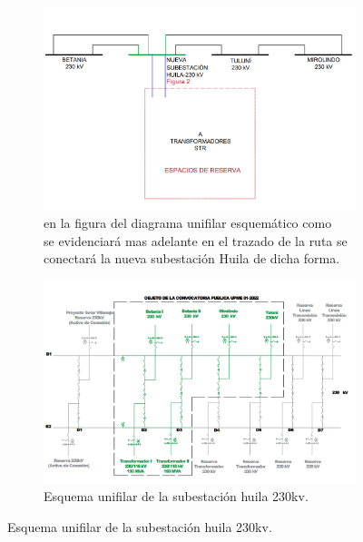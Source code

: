 \begin{figure}[h!] %
    \centering %
    \begin{subfigure}{0.5\textwidth}
        \includegraphics[width=1\textwidth]{1mer avance foticos/Esquema unifilar diagrama esquemático.png}
        \caption{en la figura del diagrama unifilar esquemático como\\ se evidenciará mas adelante en el trazado de la ruta se \\conectará la nueva subestación Huila de dicha forma.} %
        \label{fig:Esquema} %
    \end{subfigure}
    \hfill %
    \begin{subfigure}{0.5\textwidth}
        \centering %
        \includegraphics[width=1\textwidth]{1mer avance foticos/Esquema unifilar de la subestación huila 230kv.png}
        \caption{Esquema unifilar de la subestación huila 230kv.} %
        \label{fig:unifilar} %
    \end{subfigure}
    \label{fig:dos-imagenes}
\end{figure}




